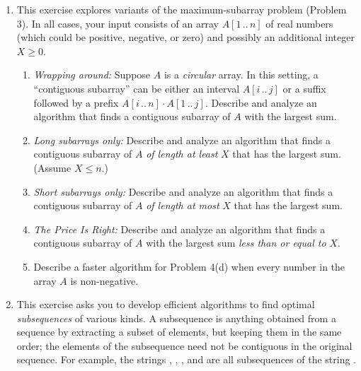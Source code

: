 \begin{enumerate}[label=\arabic*.,ref=\thechapter.\arabic*,leftmargin=*,align=left,widest*=99,itemsep=1.5ex plus 0.5ex]
\item This exercise explores variants of the maximum-subarray problem (Problem 3).
In all cases, your input consists of an array $A[1\,..\,n]$ of real numbers (which could be positive, negative, or zero) and possibly an additional integer $X \ge 0$.
\begin{enumerate}
\item \textit{Wrapping around:} Suppose $A$ is a \textit{circular} array.
In this setting, a “contiguous subarray” can be either an interval $A[i\,..\,j]$ or a suffix followed by a prefix $A[i\,..\,n] \cdot A[1\,..\,j]$.
Describe and analyze an algorithm that finds a contiguous subarray of $A$ with the largest sum.
\item \textit{Long subarrays only:} Describe and analyze an algorithm that finds a contiguous subarray of $A$ \textit{of length at least} $X$ that has the largest sum.
(Assume $X \le n$.)
\item \textit{Short subarrays only:} Describe and analyze an algorithm that finds a contiguous subarray of $A$ \textit{of length at most} $X$ that has the largest sum.
\item \textit{The Price Is Right:} Describe and analyze an algorithm that finds a contiguous subarray of $A$ with the largest sum \textit{less than or equal to} $X$.
\item Describe a faster algorithm for Problem 4(d) when every number in the array $A$ is non-negative.
\end{enumerate}

\item This exercise asks you to develop efficient algorithms to find optimal \textit{subsequences} of various kinds.
A subsequence is anything obtained from a sequence by extracting a subset of elements, but keeping them in the same order; the elements of the subsequence need not be contiguous in the original sequence.
For example, the strings , , , and  are all subsequences of the string .


\end{enumerate}
